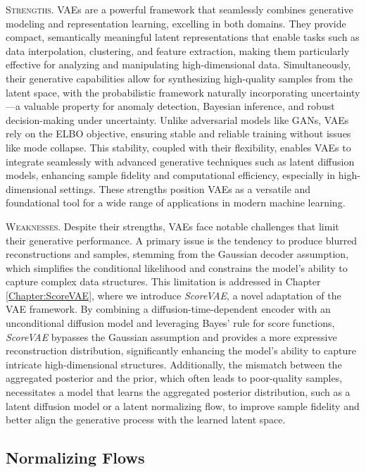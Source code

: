 \textsc{Strengths.} VAEs are a powerful framework that seamlessly combines generative modeling and representation learning, excelling in both domains. They provide compact, semantically meaningful latent representations that enable tasks such as data interpolation, clustering, and feature extraction, making them particularly effective for analyzing and manipulating high-dimensional data. Simultaneously, their generative capabilities allow for synthesizing high-quality samples from the latent space, with the probabilistic framework naturally incorporating uncertainty—a valuable property for anomaly detection, Bayesian inference, and robust decision-making under uncertainty. Unlike adversarial models like GANs, VAEs rely on the ELBO objective, ensuring stable and reliable training without issues like mode collapse. This stability, coupled with their flexibility, enables VAEs to integrate seamlessly with advanced generative techniques such as latent diffusion models, enhancing sample fidelity and computational efficiency, especially in high-dimensional settings. These strengths position VAEs as a versatile and foundational tool for a wide range of applications in modern machine learning.

\textsc{Weaknesses.} Despite their strengths, VAEs face notable challenges that limit their generative performance. A primary issue is the tendency to produce blurred reconstructions and samples, stemming from the Gaussian decoder assumption, which simplifies the conditional likelihood and constrains the model's ability to capture complex data structures. This limitation is addressed in Chapter \ref{Chapter:ScoreVAE}, where we introduce \textit{ScoreVAE}, a novel adaptation of the VAE framework. By combining a diffusion-time-dependent encoder with an unconditional diffusion model and leveraging Bayes' rule for score functions, \textit{ScoreVAE} bypasses the Gaussian assumption and provides a more expressive reconstruction distribution, significantly enhancing the model's ability to capture intricate high-dimensional structures. Additionally, the mismatch between the aggregated posterior and the prior, which often leads to poor-quality samples, necessitates a model that learns the aggregated posterior distribution, such as a latent diffusion model or a latent normalizing flow, to improve sample fidelity and better align the generative process with the learned latent space.

\subsection{Normalizing Flows}\label{sec:normalizing_flows}

